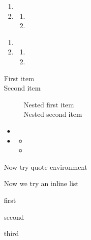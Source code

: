 \documentclass[solutionsatend,twocolumnsolutions]{ouunit}
\newenvironment{highlight}[1][]{\begin{style2box}[#1]}{\end{style2box}}
\begin{document}
\lipsum[133]
\begin{enumerate}
\item
\lipsum[133]
\item
\lipsum[133]
\begin{enumerate}
\item
\lipsum[133]
\item
\lipsum[133]
\end{enumerate}
\end{enumerate}
\begin{highlight}
\lipsum[133]
\begin{enumerate}
\item
\lipsum[133]
\item
\lipsum[133]
\begin{enumerate}
\item
\lipsum[133]
\item
\lipsum[133]
\end{enumerate}
\end{enumerate}
\end{highlight}
\lipsum[133]
\begin{description}
\item[First item]
\lipsum[133]
\item[Second item]
\lipsum[133]
\begin{description}
\item[Nested first item]
\lipsum[133]
\item[Nested second item]
\lipsum[133]
\end{description}
\end{description}
\lipsum[133]
\begin{itemize}
\item
\lipsum[133]
\item
\lipsum[133]
\begin{itemize}
\item
\lipsum[133]
\item
\lipsum[133]
\end{itemize}
\end{itemize}
\lipsum[133]

Now try quote environment
\begin{quote}
\lipsum[133]
\end{quote}

Now we try an inline list
\begin{enumerate*}
\item first 
\item second
\item third
\end{enumerate*}
\end{document}
